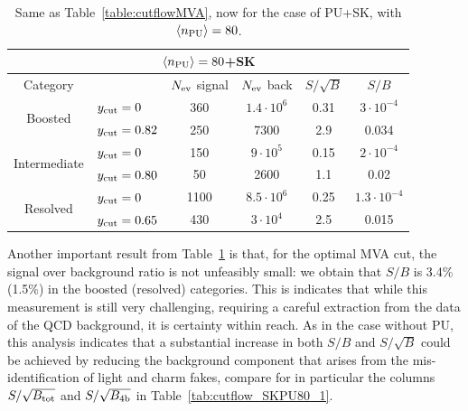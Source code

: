 \begin{table}[t]
  \centering
  \begin{tabular}{|c|l|c|c|c|c|}
        \hline
     \multicolumn{6}{|c|}{$\left\langle n_{\rm PU}\right\rangle=80$+SK} \\
     \hline
         \hline
    Category  &   &  $N_{\rm ev}$ signal &  $N_{\rm ev}$ back  &  $S/\sqrt{B}$ & $S/B$ \\ 
    \hline
    \hline
    \multirow{2}{*}{Boosted} &  $y_{\rm cut}=0$  & 360   &  $1.4\cdot 10^6$ & 0.31   &
     $3\cdot 10^{-4}$  \\
    &  $y_{\rm cut}=0.82$ &  250 & 7300  & 2.9    & 0.034  \\
    \hline
    \hline
    \multirow{2}{*}{Intermediate} &  $y_{\rm cut}=0$  &  150  & $9\cdot 10^5$    & 0.15    &
     $2\cdot 10^{-4}$ \\
    &  $y_{\rm cut}=0.80$ & 50 & 2600  &  1.1   & 0.02 \\
    \hline
    \hline
    \multirow{2}{*}{Resolved} &  $y_{\rm cut}=0$  &  1100  & $8.5\cdot 10^6$
    & 0.25    &  $1.3\cdot 10^{-4}$  \\
    &  $y_{\rm cut}=0.65$ & 430  & $3\cdot 10^4$  &  2.5   & 0.015  \\
    \hline
      \end{tabular}
  \caption{\small Same as Table~\ref{table:cutflowMVA}, now for the case
    of PU+SK, with $\left\langle n_{\rm PU}\right\rangle=80$.
        \label{table:cutflowMVA_PU}
  }
\end{table}

Another important result from Table~\ref{table:cutflowMVA_PU} is that,
for the optimal MVA cut, the signal over background ratio
is not unfeasibly small: we obtain that $S/B$ is 3.4\% (1.5\%)
in the boosted (resolved) categories.
%
This is indicates that while this measurement is still very challenging,
requiring a careful extraction from the data of the QCD
background, it is certainty within reach.
%
As in the case without PU, 
this analysis  indicates that a substantial increase in both
$S/B$ and $S/\sqrt{B}$ could be achieved by reducing the background component
that arises from the mis-identification of light and charm
fakes, compare for in particular the columns $S/\sqrt{B_{\rm tot}}$
and  $S/\sqrt{B_{\rm 4b}}$ in  Table~\ref{tab:cutflow_SKPU80_1}.

